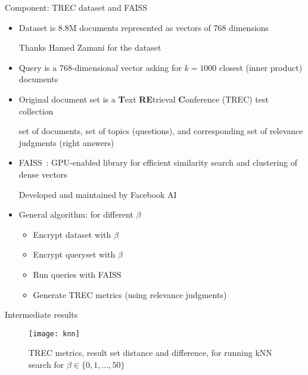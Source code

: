 	\begin{frame}{Component: TREC dataset and FAISS~\cite{faiss}}

		\begin{itemize}
			\item<1->
				Dataset is 8.8M documents represented as vectors of 768 dimensions \\
				\begin{small}
					Thanks Hamed Zamani for the dataset
				\end{small}

			\item<2->
				Query is a 768-dimensional vector asking for $k = 1000$ closest (inner product) documents

			\item<3->
				Original document set is a \textbf{T}ext \textbf{RE}trieval \textbf{C}onference (TREC) test collection \\
				\begin{small}
					set of documents, set of topics (questions), and corresponding set of relevance judgments (right answers)
				\end{small}

			\item<4->
				FAISS~\cite{faiss}: GPU-enabled library for efficient similarity search and clustering of dense vectors
				\begin{small}
					Developed and maintained by Facebook AI
				\end{small}

			\item<5->
				General algorithm: for different $\beta$
				\begin{itemize}
					\item Encrypt dataset with $\beta$
					\item Encrypt queryset with $\beta$
					\item Run queries with FAISS
					\item Generate TREC metrics (using relevance judgments)
				\end{itemize}

		\end{itemize}

	\end{frame}

	\begin{frame}{Intermediate results}

		\begin{figure}[h]
			\centering
			\texttt{[image: knn]}
			\caption{TREC metrics, result set distance and difference, for running kNN search for $\beta \in \{ 0, 1, \ldots , 50 \} $}
		\end{figure}

	\end{frame}
